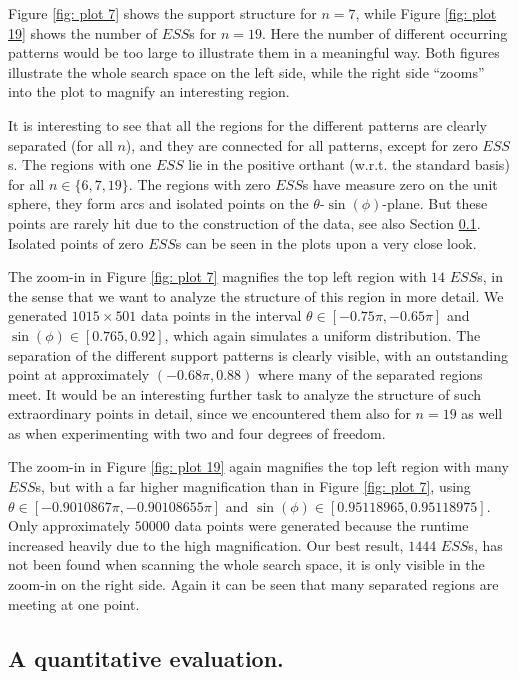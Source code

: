 \documentclass[moor]{informs3}              %
\begin{document}
Figure \ref{fig: plot 7} shows the support structure for $n=7$, while Figure \ref{fig: plot 19} shows the number of $ESS$s for $n=19$. Here the number of different occurring patterns would be too large to illustrate them in a meaningful way. Both figures illustrate the whole search space on the left side, while the right side ``zooms'' into the plot to magnify an interesting region.

It is interesting to see that all the regions for the different patterns are clearly separated (for all $n$), and they are connected for all patterns, except for zero $ESS$s. The regions with one $ESS$ lie in the positive orthant (w.r.t. the standard basis) for all $n\in\{6,7,19\}$. The regions with zero $ESS$s have measure zero on the unit sphere, they form arcs and isolated points on the $\theta$-$\sin(\phi)$-plane. But these points are rarely hit due to the construction of the data, see also Section \ref{descriptive}. Isolated points of zero $ESS$s can be seen in the plots upon a very close look.

The zoom-in in Figure \ref{fig: plot 7} magnifies the top left region with $14$ $ESS$s, in the sense that we want to analyze the structure of this region in more detail. We generated $1015 \times 501$ data points in the interval $\theta \in [-0.75\pi,-0.65\pi]$ and $\sin(\phi) \in [0.765,0.92]$, which again simulates a uniform distribution. The separation of the different support patterns is clearly visible, with an outstanding point at approximately $(-0.68\pi,0.88)$ where many of the separated regions meet. It would be an interesting further task to analyze the structure of such extraordinary points in detail, since we encountered them also for $n=19$ as well as when experimenting with two and four degrees of freedom.

The zoom-in in Figure \ref{fig: plot 19} again magnifies the top left region with many $ESS$s, but with a far higher magnification than in Figure \ref{fig: plot 7}, using $\theta \in [-0.9010867\pi,-0.90108655\pi]$ and $\sin(\phi) \in [0.95118965,0.95118975]$. Only approximately $50 000$ data points were generated because the runtime increased heavily due to the high magnification. Our best result, $1444$ $ESS$s, has not been found when scanning the whole search space, it is only visible in the zoom-in on the right side. Again it can be seen that many separated regions are
meeting at one point.


\subsection{A quantitative evaluation.}
\label{descriptive}
\end{document}
